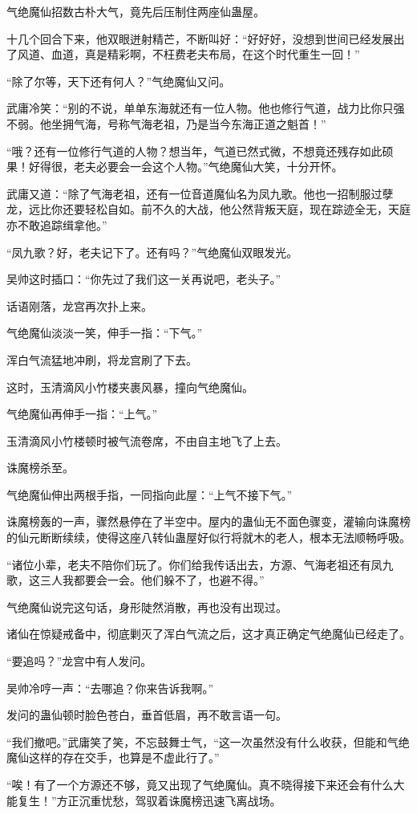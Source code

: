 \begin{this_body}
气绝魔仙招数古朴大气，竟先后压制住两座仙蛊屋。

十几个回合下来，他双眼迸射精芒，不断叫好：“好好好，没想到世间已经发展出了风道、血道，真是精彩啊，不枉费老夫布局，在这个时代重生一回！”

“除了尔等，天下还有何人？”气绝魔仙又问。

武庸冷笑：“别的不说，单单东海就还有一位人物。他也修行气道，战力比你只强不弱。他坐拥气海，号称气海老祖，乃是当今东海正道之魁首！”

“哦？还有一位修行气道的人物？想当年，气道已然式微，不想竟还残存如此硕果！好得很，老夫必要会一会这个人物。”气绝魔仙大笑，十分开怀。

武庸又道：“除了气海老祖，还有一位音道魔仙名为凤九歌。他也一招制服过孽龙，远比你还要轻松自如。前不久的大战，他公然背叛天庭，现在踪迹全无，天庭亦不敢追踪缉拿他。”

“凤九歌？好，老夫记下了。还有吗？”气绝魔仙双眼发光。

吴帅这时插口：“你先过了我们这一关再说吧，老头子。”

话语刚落，龙宫再次扑上来。

气绝魔仙淡淡一笑，伸手一指：“下气。”

浑白气流猛地冲刷，将龙宫刷了下去。

这时，玉清滴风小竹楼夹裹风暴，撞向气绝魔仙。

气绝魔仙再伸手一指：“上气。”

玉清滴风小竹楼顿时被气流卷席，不由自主地飞了上去。

诛魔榜杀至。

气绝魔仙伸出两根手指，一同指向此屋：“上气不接下气。”

诛魔榜轰的一声，骤然悬停在了半空中。屋内的蛊仙无不面色骤变，灌输向诛魔榜的仙元断断续续，使得这座八转仙蛊屋好似行将就木的老人，根本无法顺畅呼吸。

“诸位小辈，老夫不陪你们玩了。你们给我传话出去，方源、气海老祖还有凤九歌，这三人我都要会一会。他们躲不了，也避不得。”

气绝魔仙说完这句话，身形陡然消散，再也没有出现过。

诸仙在惊疑戒备中，彻底剿灭了浑白气流之后，这才真正确定气绝魔仙已经走了。

“要追吗？”龙宫中有人发问。

吴帅冷哼一声：“去哪追？你来告诉我啊。”

发问的蛊仙顿时脸色苍白，垂首低眉，再不敢言语一句。

“我们撤吧。”武庸笑了笑，不忘鼓舞士气，“这一次虽然没有什么收获，但能和气绝魔仙这样的存在交手，也算是不虚此行了。”

“唉！有了一个方源还不够，竟又出现了气绝魔仙。真不晓得接下来还会有什么大能复生！”方正沉重忧愁，驾驭着诛魔榜迅速飞离战场。

\end{this_body}

